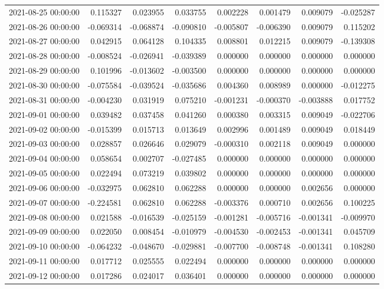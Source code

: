 \begin{tabular}{lrrrrrrr}
2021-08-25 00:00:00 & 0.115327 & 0.023955 & 0.033755 & 0.002228 & 0.001479 & 0.009079 & -0.025287 \\
2021-08-26 00:00:00 & -0.069314 & -0.068874 & -0.090810 & -0.005807 & -0.006390 & 0.009079 & 0.115202 \\
2021-08-27 00:00:00 & 0.042915 & 0.064128 & 0.104335 & 0.008801 & 0.012215 & 0.009079 & -0.139308 \\
2021-08-28 00:00:00 & -0.008524 & -0.026941 & -0.039389 & 0.000000 & 0.000000 & 0.000000 & 0.000000 \\
2021-08-29 00:00:00 & 0.101996 & -0.013602 & -0.003500 & 0.000000 & 0.000000 & 0.000000 & 0.000000 \\
2021-08-30 00:00:00 & -0.075584 & -0.039524 & -0.035686 & 0.004360 & 0.008989 & 0.000000 & -0.012275 \\
2021-08-31 00:00:00 & -0.004230 & 0.031919 & 0.075210 & -0.001231 & -0.000370 & -0.003888 & 0.017752 \\
2021-09-01 00:00:00 & 0.039482 & 0.037458 & 0.041260 & 0.000380 & 0.003315 & 0.009049 & -0.022706 \\
2021-09-02 00:00:00 & -0.015399 & 0.015713 & 0.013649 & 0.002996 & 0.001489 & 0.009049 & 0.018449 \\
2021-09-03 00:00:00 & 0.028857 & 0.026646 & 0.029079 & -0.000310 & 0.002118 & 0.009049 & 0.000000 \\
2021-09-04 00:00:00 & 0.058654 & 0.002707 & -0.027485 & 0.000000 & 0.000000 & 0.000000 & 0.000000 \\
2021-09-05 00:00:00 & 0.022494 & 0.073219 & 0.039802 & 0.000000 & 0.000000 & 0.000000 & 0.000000 \\
2021-09-06 00:00:00 & -0.032975 & 0.062810 & 0.062288 & 0.000000 & 0.000000 & 0.002656 & 0.000000 \\
2021-09-07 00:00:00 & -0.224581 & 0.062810 & 0.062288 & -0.003376 & 0.000710 & 0.002656 & 0.100225 \\
2021-09-08 00:00:00 & 0.021588 & -0.016539 & -0.025159 & -0.001281 & -0.005716 & -0.001341 & -0.009970 \\
2021-09-09 00:00:00 & 0.022050 & 0.008454 & -0.010979 & -0.004530 & -0.002453 & -0.001341 & 0.045709 \\
2021-09-10 00:00:00 & -0.064232 & -0.048670 & -0.029881 & -0.007700 & -0.008748 & -0.001341 & 0.108280 \\
2021-09-11 00:00:00 & 0.017712 & 0.025555 & 0.022494 & 0.000000 & 0.000000 & 0.000000 & 0.000000 \\
2021-09-12 00:00:00 & 0.017286 & 0.024017 & 0.036401 & 0.000000 & 0.000000 & 0.000000 & 0.000000 \\

\end{tabular}
